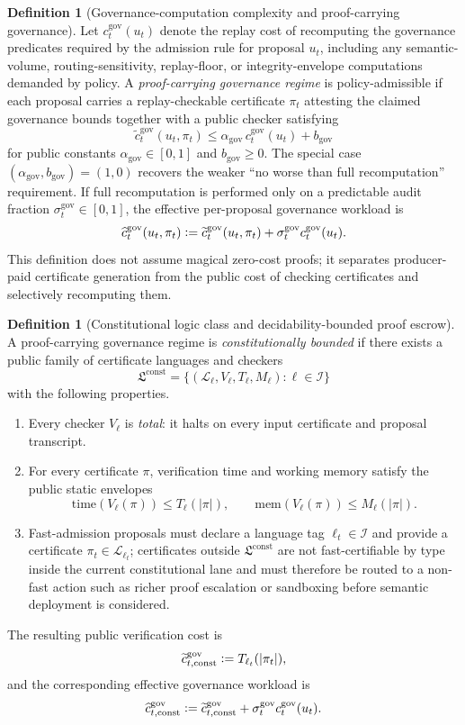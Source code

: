 \documentclass[11pt]{article}
\theoremstyle{definition}
\newtheorem{definition}[theorem]{Definition}
\newcommand{\1}{\mathbf{1}}
\newcommand{\Defeq}{\vcentcolon=}
\begin{document}
\begin{definition}[Governance-computation complexity and proof-carrying governance]\label{def:pcg}
Let $c_t^{\mathrm{gov}}(u_t)$ denote the replay cost of recomputing the governance predicates required by the admission rule for proposal $u_t$, including any semantic-volume, routing-sensitivity, replay-floor, or integrity-envelope computations demanded by policy. A \emph{proof-carrying governance regime} is policy-admissible if each proposal carries a replay-checkable certificate $\pi_t$ attesting the claimed governance bounds together with a public checker satisfying
\[
\widetilde c_t^{\mathrm{gov}}(u_t,\pi_t)\le \alpha_{\mathrm{gov}}\,c_t^{\mathrm{gov}}(u_t)+b_{\mathrm{gov}}
\]
for public constants $\alpha_{\mathrm{gov}}\in[0,1]$ and $b_{\mathrm{gov}}\ge 0$. The special case $(\alpha_{\mathrm{gov}},b_{\mathrm{gov}})=(1,0)$ recovers the weaker ``no worse than full recomputation'' requirement. If full recomputation is performed only on a predictable audit fraction $\sigma_t^{\mathrm{gov}}\in[0,1]$, the effective per-proposal governance workload is
\[
\widehat c_t^{\mathrm{gov}}(u_t,\pi_t)\Defeq \widetilde c_t^{\mathrm{gov}}(u_t,\pi_t)+\sigma_t^{\mathrm{gov}}c_t^{\mathrm{gov}}(u_t).
\]
This definition does not assume magical zero-cost proofs; it separates producer-paid certificate generation from the public cost of checking certificates and selectively recomputing them.
\end{definition}


\begin{definition}[Constitutional logic class and decidability-bounded proof escrow]\label{def:constitutional_logic}
A proof-carrying governance regime is \emph{constitutionally bounded} if there exists a public family of certificate languages and checkers
\[
\mathfrak L^{\mathrm{const}}=\{(\mathcal L_\ell,V_\ell,T_\ell,M_\ell):\ell\in\mathcal I\}
\]
with the following properties.
\begin{enumerate}[label=(\roman*), leftmargin=2em]
  \item Every checker $V_\ell$ is \emph{total}: it halts on every input certificate and proposal transcript.
  \item For every certificate $\pi$, verification time and working memory satisfy the public static envelopes
  \[
  \mathrm{time}(V_\ell(\pi))\le T_\ell(|\pi|),
  \qquad
  \mathrm{mem}(V_\ell(\pi))\le M_\ell(|\pi|).
  \]
  \item Fast-admission proposals must declare a language tag $\ell_t\in\mathcal I$ and provide a certificate $\pi_t\in\mathcal L_{\ell_t}$; certificates outside $\mathfrak L^{\mathrm{const}}$ are not fast-certifiable by type inside the current constitutional lane and must therefore be routed to a non-fast action such as richer proof escalation or sandboxing before semantic deployment is considered.
\end{enumerate}
The resulting public verification cost is
\[
\widetilde c_{t,\mathrm{const}}^{\mathrm{gov}}\Defeq T_{\ell_t}(|\pi_t|),
\]
and the corresponding effective governance workload is
\[
\widehat c_{t,\mathrm{const}}^{\mathrm{gov}}
\Defeq
\widetilde c_{t,\mathrm{const}}^{\mathrm{gov}}+\sigma_t^{\mathrm{gov}}c_t^{\mathrm{gov}}(u_t).
\]
\end{definition}
\end{document}
